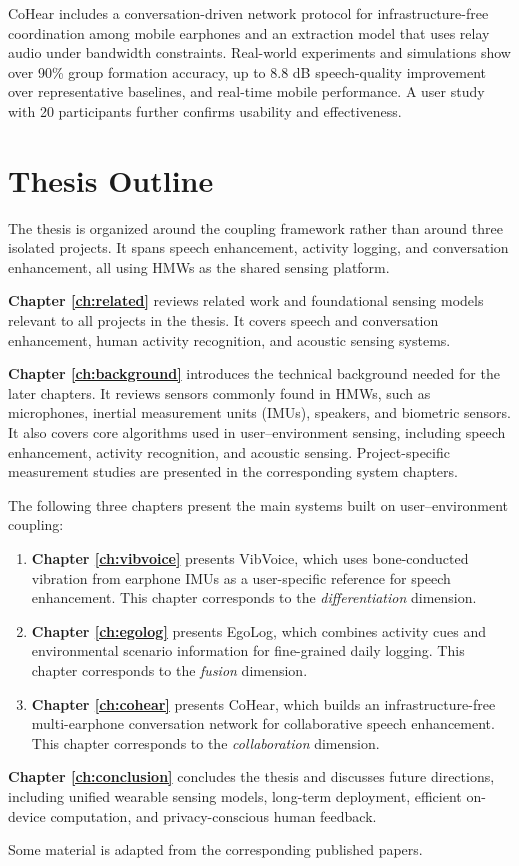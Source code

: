 \begin{enumerate}
    CoHear includes a conversation-driven network protocol for infrastructure-free coordination among mobile earphones and an extraction model that uses relay audio under bandwidth constraints. Real-world experiments and simulations show over 90\% group formation accuracy, up to 8.8 dB speech-quality improvement over representative baselines, and real-time mobile performance. A user study with 20 participants further confirms usability and effectiveness.
\end{enumerate}

\section{Thesis Outline}

The thesis is organized around the coupling framework rather than around three isolated projects. It spans speech enhancement, activity logging, and conversation enhancement, all using HMWs as the shared sensing platform.

\textbf{Chapter \ref{ch:related}} reviews related work and foundational sensing models relevant to all projects in the thesis. It covers speech and conversation enhancement, human activity recognition, and acoustic sensing systems.

\textbf{Chapter \ref{ch:background}} introduces the technical background needed for the later chapters. It reviews sensors commonly found in HMWs, such as microphones, inertial measurement units (IMUs), speakers, and biometric sensors. It also covers core algorithms used in user--environment sensing, including speech enhancement, activity recognition, and acoustic sensing. Project-specific measurement studies are presented in the corresponding system chapters.

The following three chapters present the main systems built on user--environment coupling:
\begin{enumerate}
    \item \textbf{Chapter \ref{ch:vibvoice}} presents VibVoice, which uses bone-conducted vibration from earphone IMUs as a user-specific reference for speech enhancement. This chapter corresponds to the \textit{differentiation} dimension.
    \item \textbf{Chapter \ref{ch:egolog}} presents EgoLog, which combines activity cues and environmental scenario information for fine-grained daily logging. This chapter corresponds to the \textit{fusion} dimension.
    \item \textbf{Chapter \ref{ch:cohear}} presents CoHear, which builds an infrastructure-free multi-earphone conversation network for collaborative speech enhancement. This chapter corresponds to the \textit{collaboration} dimension.
\end{enumerate}

\textbf{Chapter \ref{ch:conclusion}} concludes the thesis and discusses future directions, including unified wearable sensing models, long-term deployment, efficient on-device computation, and privacy-conscious human feedback.

Some material is adapted from the corresponding published papers.
